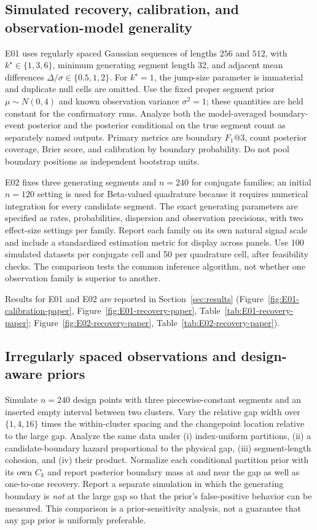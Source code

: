 \subsection{Simulated recovery, calibration, and observation-model generality}
E01 uses regularly spaced Gaussian sequences of lengths $256$ and $512$, with
$k^\star\in\{1,3,6\}$, minimum generating segment length 32, and adjacent
mean differences $\Delta/\sigma\in\{0.5,1,2\}$. For $k^\star=1$, the
jump-size parameter is immaterial and duplicate null cells are omitted.
Use the fixed proper segment prior $\mu\sim N(0,4)$ and known
observation variance $\sigma^2=1$; these quantities are held constant
for the confirmatory runs. Analyze both the
model-averaged boundary-event posterior and the posterior conditional on the
true segment count as separately named outputs. Primary metrics are boundary
$F_1@3$, count posterior coverage, Brier score, and calibration by boundary
probability. Do not pool boundary positions as independent bootstrap units.

E02 fixes three generating segments and $n=240$ for conjugate families; an
initial $n=120$ setting is used for Beta-valued quadrature because it requires
numerical integration for every candidate segment. The exact generating
parameters are specified as rates, probabilities, dispersion and observation
precisions, with two effect-size settings per family. Report each family on
its own natural signal scale and include a standardized estimation metric for
display across panels. Use 100 simulated datasets per conjugate cell
and 50 per quadrature cell, after feasibility checks. The comparison tests
the common inference algorithm, not whether one observation family is superior
to another.

Results for E01 and E02 are reported in Section~\ref{sec:results}
(Figure~\ref{fig:E01-calibration-paper}, Figure~\ref{fig:E01-recovery-paper},
Table~\ref{tab:E01-recovery-paper}; Figure~\ref{fig:E02-recovery-paper},
Table~\ref{tab:E02-recovery-paper}).

\subsection{Irregularly spaced observations and design-aware priors}
Simulate $n=240$ design points with three piecewise-constant segments and an
inserted empty interval between two clusters. Vary the relative gap width over
$\{1,4,16\}$ times the within-cluster spacing and the changepoint location
relative to the large gap. Analyze the same data under (i) index-uniform
partitions, (ii) a candidate-boundary hazard proportional to the physical gap,
(iii) segment-length cohesion, and (iv) their product. Normalize each
conditional partition prior with its own $C_k$ and report posterior boundary
mass at and near the gap as well as one-to-one recovery. Report a separate
simulation in which the generating boundary is \emph{not} at the large gap so
that the prior's false-positive behavior can be measured. This comparison is
a prior-sensitivity analysis, not a guarantee that any gap prior is uniformly
preferable.

